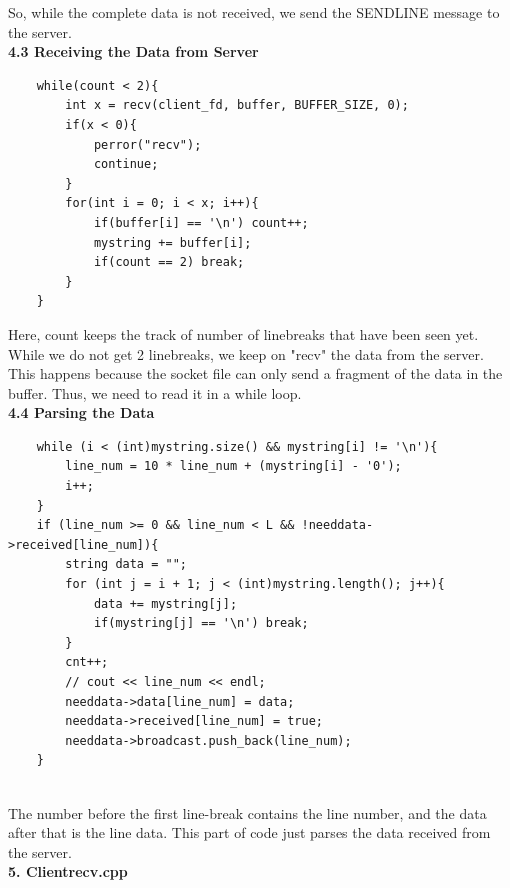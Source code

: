 \documentclass[12pt]{scrartcl}
\begin{document}
So, while the complete data is not received, we send the SENDLINE message to the server. \\

\textbf{4.3 Receiving the Data from Server}
\begin{verbatim}
    while(count < 2){
        int x = recv(client_fd, buffer, BUFFER_SIZE, 0);
        if(x < 0){
            perror("recv");
            continue;
        }
        for(int i = 0; i < x; i++){
            if(buffer[i] == '\n') count++;
            mystring += buffer[i];
            if(count == 2) break;
        }
    }
\end{verbatim}

Here, count keeps the track of number of linebreaks that have been seen yet. While we do not get 2 linebreaks, we keep on "recv" the data from the server. This happens because the socket file can only send a fragment of the data in the buffer. Thus, we need to read it in a while loop.\\ 

\textbf{4.4 Parsing the Data}
\begin{verbatim}
    while (i < (int)mystring.size() && mystring[i] != '\n'){
        line_num = 10 * line_num + (mystring[i] - '0');
        i++;
    }
    if (line_num >= 0 && line_num < L && !needdata->received[line_num]){
        string data = "";
        for (int j = i + 1; j < (int)mystring.length(); j++){
            data += mystring[j];
            if(mystring[j] == '\n') break;
        }
        cnt++;
        // cout << line_num << endl;
        needdata->data[line_num] = data;
        needdata->received[line_num] = true;
        needdata->broadcast.push_back(line_num);
    }
\end{verbatim}\\

The number before the first line-break contains the line number, and the data after that is the line data. This part of code just parses the data received from the server. \\ 

\textbf{5. Clientrecv.cpp}\\
\end{document}
